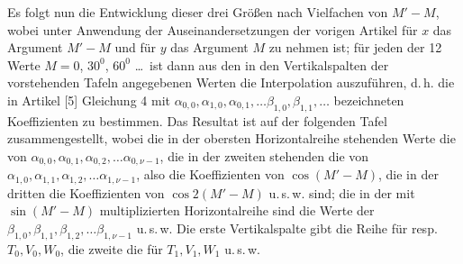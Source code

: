 \begin{landscape}
\begingroup
\fontsize{10}{13}\selectfont
{}
\renewcommand{\headrulewidth}{0pt}
Es folgt nun die Entwicklung dieser drei Größen nach Vielfachen von \(M'-M\), wobei unter
Anwendung der Auseinandersetzungen der vorigen Artikel für \(x\) das Argument \(M'-M\) und für \(y\)
das Argument \(M\) zu nehmen ist; für jeden der 12 Werte \(M=0\), \(30^0\), \(60^0\) \dots\ ist dann
aus den in den Vertikalspalten der vorstehenden Tafeln angegebenen Werten die Interpolation
auszuführen, d.\,h. die in Artikel [5] Gleichung 4 mit \(\alpha_{0,0}, \alpha_{1,0}, \alpha_{0,1},
\dots \beta_{1,0}, \beta_{1,1}, \dots\) bezeichneten Koeffizienten zu bestimmen. Das Resultat
ist auf der folgenden Tafel zusammengestellt, wobei die in der obersten Horizontalreihe
stehenden Werte die von \(\alpha_{0,0}, \alpha_{0,1}, \alpha_{0,2}, \dots \alpha_{0,\nu-1}\),
die in der zweiten stehenden die von \(\alpha_{1,0}, \alpha_{1,1}, \alpha_{1,2}, \dots
\alpha_{1,\nu-1}\), also die Koeffizienten von \(\cos(M'-M)\), die in der dritten die
Koeffizienten von \(\cos 2(M'-M)\) u.\,s.\,w. sind; die in der mit \(\sin(M'-M)\) multiplizierten
Horizontalreihe sind die Werte der \(\beta_{1,0}, \beta_{1,1}, \beta_{1,2}, \dots
\beta_{1,\nu-1}\) u.\,s.\,w. Die erste Vertikalspalte gibt die Reihe für resp. \(T_0, V_0, W_0\),
die zweite die für \(T_1, V_1, W_1\) u.\,s.\,w.


\end{landscape}
